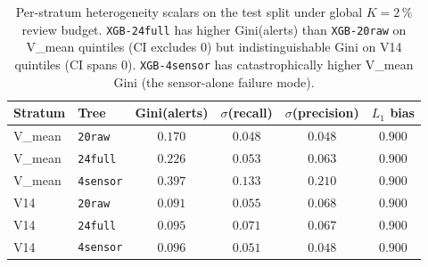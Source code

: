 \begin{table}[t]
\centering
\small
\caption{Per-stratum heterogeneity scalars on the test split under
global $K{=}2\,\%$ review budget. \texttt{XGB-24full} has higher
Gini(alerts) than \texttt{XGB-20raw} on V\_mean quintiles (CI excludes 0)
but indistinguishable Gini on V14 quintiles (CI spans 0).
\texttt{XGB-4sensor} has catastrophically higher V\_mean Gini (the
sensor-alone failure mode).}
\label{tab:p8-subgroup-fairness}
\begin{tabular}{llcccc}
\toprule
Stratum & Tree & Gini(alerts) & $\sigma$(recall) & $\sigma$(precision) & $L_1$ bias \\
\midrule
V\_mean & \texttt{20raw}  & $0.170$ & $0.048$ & $0.048$ & $0.900$ \\
V\_mean & \texttt{24full} & $0.226$ & $0.053$ & $0.063$ & $0.900$ \\
V\_mean & \texttt{4sensor}& $0.397$ & $0.133$ & $0.210$ & $0.900$ \\
V14     & \texttt{20raw}  & $0.091$ & $0.055$ & $0.068$ & $0.900$ \\
V14     & \texttt{24full} & $0.095$ & $0.071$ & $0.067$ & $0.900$ \\
V14     & \texttt{4sensor}& $0.096$ & $0.051$ & $0.048$ & $0.900$ \\
\bottomrule
\end{tabular}
\end{table}

